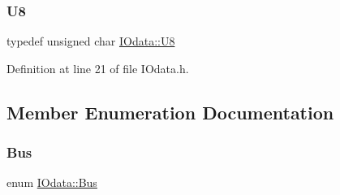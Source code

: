 \subsubsection{\texorpdfstring{U8}{U8}}
{\footnotesize\ttfamily typedef unsigned char \hyperlink{classIOdata_a18d1354b7cdaf0f8a8001fdbb3ced418}{I\+Odata\+::\+U8}}



Definition at line 21 of file I\+Odata.\+h.



\subsection{Member Enumeration Documentation}
\mbox{\label{classIOdata_a99aa7bed39364c4359ab8a7596bc013c}} 
\subsubsection{\texorpdfstring{Bus}{Bus}}
{\footnotesize\ttfamily enum \hyperlink{classIOdata_a99aa7bed39364c4359ab8a7596bc013c}{I\+Odata\+::\+Bus}}

